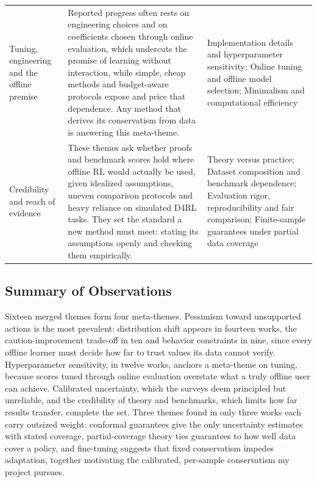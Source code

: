 \documentclass[11pt]{article}
\newcommand{\bookmarked}[3]{#1*{#3}\phantomsection\addcontentsline{toc}{#2}{#3}}
\begin{document}
{\begin{longtable}{P{3.4cm} P{6.6cm} P{5.2cm}}
\addlinespace
Tuning, engineering and the offline premise & Reported progress often rests on engineering choices and on coefficients chosen through online evaluation, which undercuts the promise of learning without interaction, while simple, cheap methods and budget-aware protocols expose and price that dependence. Any method that derives its conservatism from data is answering this meta-theme. & Implementation details and hyperparameter sensitivity; Online tuning and offline model selection; Minimalism and computational efficiency \\
\addlinespace
Credibility and reach of evidence & These themes ask whether proofs and benchmark scores hold where offline RL would actually be used, given idealized assumptions, uneven comparison protocols and heavy reliance on simulated D4RL tasks. They set the standard a new method must meet: stating its assumptions openly and checking them empirically. & Theory versus practice; Dataset composition and benchmark dependence; Evaluation rigor, reproducibility and fair comparison; Finite-sample guarantees under partial data coverage \\
\bottomrule
\end{longtable}}

\bookmarked{\subsection}{subsection}{Summary of Observations}

Sixteen merged themes form four meta-themes. Pessimism toward unsupported actions is the most prevalent: distribution shift appears in fourteen works, the caution-improvement trade-off in ten and behavior constraints in nine, since every offline learner must decide how far to trust values its data cannot verify. Hyperparameter sensitivity, in twelve works, anchors a meta-theme on tuning, because scores tuned through online evaluation overstate what a truly offline user can achieve. Calibrated uncertainty, which the surveys deem principled but unreliable, and the credibility of theory and benchmarks, which limits how far results transfer, complete the set. Three themes found in only three works each carry outsized weight: conformal guarantees give the only uncertainty estimates with stated coverage, partial-coverage theory ties guarantees to how well data cover a policy, and fine-tuning suggests that fixed conservatism impedes adaptation, together motivating the calibrated, per-sample conservatism my project pursues.
\end{document}
